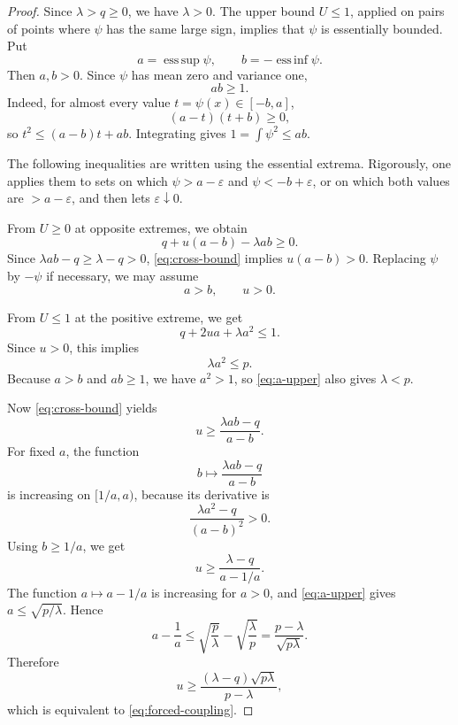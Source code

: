 \documentclass[11pt]{article}
\newcommand{\esssup}{\operatorname*{ess\,sup}}
\newcommand{\essinf}{\operatorname*{ess\,inf}}
\begin{document}
\begin{proof}
Since $\lambda>q\ge0$, we have $\lambda>0$.  The upper bound $U\le1$, applied on pairs of points where $\psi$ has the same large sign, implies that $\psi$ is essentially bounded.  Put
\[
        a=\esssup\psi,
        \qquad
        b=-\essinf\psi.
\]
Then $a,b>0$.  Since $\psi$ has mean zero and variance one,
\begin{equation}\label{eq:ab-ge-one}
        ab\ge1.
\end{equation}
Indeed, for almost every value $t=\psi(x)\in[-b,a]$,
\[
        (a-t)(t+b)\ge0,
\]
so $t^2\le(a-b)t+ab$.  Integrating gives $1=\int\psi^2\le ab$.

The following inequalities are written using the essential extrema.  Rigorously, one applies them to sets on which $\psi>a-\varepsilon$ and $\psi<-b+\varepsilon$, or on which both values are $>a-\varepsilon$, and then lets $\varepsilon\downarrow0$.

From $U\ge0$ at opposite extremes, we obtain
\begin{equation}\label{eq:cross-bound}
        q+u(a-b)-\lambda ab\ge0.
\end{equation}
Since $\lambda ab-q\ge\lambda-q>0$, \eqref{eq:cross-bound} implies $u(a-b)>0$.  Replacing $\psi$ by $-\psi$ if necessary, we may assume
\begin{equation}\label{eq:orientation}
        a>b,
        \qquad u>0.
\end{equation}

From $U\le1$ at the positive extreme, we get
\begin{equation}\label{eq:upper-aa}
        q+2ua+\lambda a^2\le1.
\end{equation}
Since $u>0$, this implies
\begin{equation}\label{eq:a-upper}
        \lambda a^2\le p.
\end{equation}
Because $a>b$ and $ab\ge1$, we have $a^2>1$, so \eqref{eq:a-upper} also gives $\lambda<p$.

Now \eqref{eq:cross-bound} yields
\[
        u\ge\frac{\lambda ab-q}{a-b}.
\]
For fixed $a$, the function
\[
        b\mapsto \frac{\lambda ab-q}{a-b}
\]
is increasing on $[1/a,a)$, because its derivative is
\[
        \frac{\lambda a^2-q}{(a-b)^2}>0.
\]
Using $b\ge1/a$, we get
\[
        u\ge\frac{\lambda-q}{a-1/a}.
\]
The function $a\mapsto a-1/a$ is increasing for $a>0$, and \eqref{eq:a-upper} gives $a\le\sqrt{p/\lambda}$.  Hence
\[
        a-\frac1a
        \le
        \sqrt{\frac p\lambda}-\sqrt{\frac\lambda p}
        =\frac{p-\lambda}{\sqrt{p\lambda}}.
\]
Therefore
\[
        u\ge
        \frac{(\lambda-q)\sqrt{p\lambda}}{p-\lambda},
\]
which is equivalent to \eqref{eq:forced-coupling}.
\end{proof}
\end{document}
